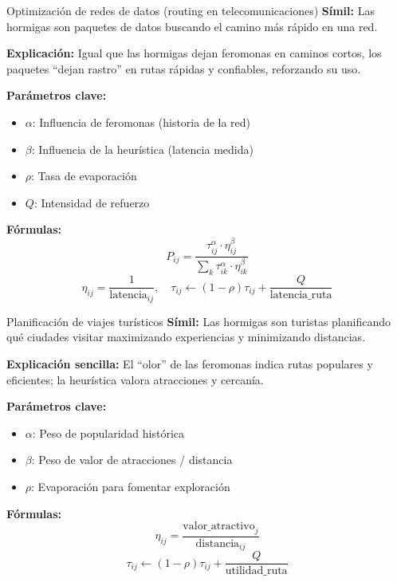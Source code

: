 \documentclass{beamer}
\begin{document}
\begin{frame}{Optimización de redes de datos (routing en telecomunicaciones)}
\textbf{Símil:} Las hormigas son paquetes de datos buscando el camino más rápido en una red.

\medskip
\textbf{Explicación:} Igual que las hormigas dejan feromonas en caminos cortos, los paquetes “dejan rastro” en rutas rápidas y confiables, reforzando su uso.

\medskip
\textbf{Parámetros clave:}
\begin{itemize}[noitemsep]
    \item $\alpha$: Influencia de feromonas (historia de la red)
    \item $\beta$: Influencia de la heurística (latencia medida)
    \item $\rho$: Tasa de evaporación
    \item $Q$: Intensidad de refuerzo
\end{itemize}

\medskip
\textbf{Fórmulas:}
\[
P_{ij} = \frac{\tau_{ij}^\alpha \cdot \eta_{ij}^\beta}{\sum_{k} \tau_{ik}^\alpha \cdot \eta_{ik}^\beta}
\]
\[
\eta_{ij} = \frac{1}{\text{latencia}_{ij}}, \quad
\tau_{ij} \leftarrow (1-\rho)\tau_{ij} + \frac{Q}{\text{latencia\_ruta}}
\]
\end{frame}

\begin{frame}{Planificación de viajes turísticos}
\textbf{Símil:} Las hormigas son turistas planificando qué ciudades visitar maximizando experiencias y minimizando distancias.

\medskip
\textbf{Explicación sencilla:} El “olor” de las feromonas indica rutas populares y eficientes; la heurística valora atracciones y cercanía.

\medskip
\textbf{Parámetros clave:}
\begin{itemize}[noitemsep]
    \item $\alpha$: Peso de popularidad histórica
    \item $\beta$: Peso de valor de atracciones / distancia
    \item $\rho$: Evaporación para fomentar exploración
\end{itemize}

\medskip
\textbf{Fórmulas:}
\[
\eta_{ij} = \frac{\text{valor\_atractivo}_j}{\text{distancia}_{ij}}
\]
\[
\tau_{ij} \leftarrow (1-\rho)\tau_{ij} + \frac{Q}{\text{utilidad\_ruta}}
\]
\end{frame}
\end{document}
